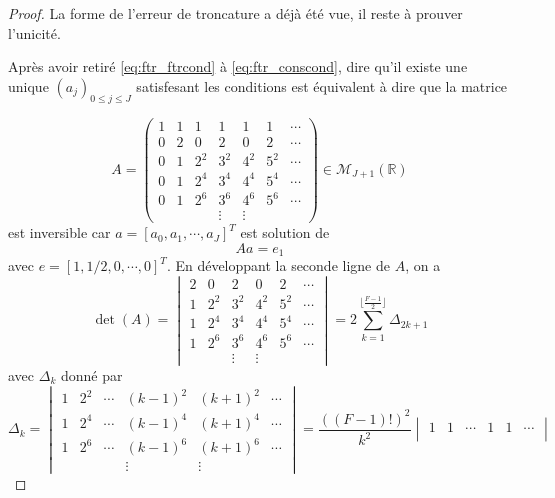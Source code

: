 \begin{proof}
La forme de l'erreur de troncature a déjà été vue, il reste à prouver l'unicité.

Après avoir retiré \eqref{eq:ftr_ftrcond} à \eqref{eq:ftr_conscond}, dire qu'il existe une unique $(a_j)_{0 \leq j \leq J}$ satisfesant les conditions est équivalent à dire que la matrice

\begin{equation}
A=\begin{pmatrix}
1 &  1  &  1  &  1  &  1  &  1  & \cdots\\  
0 &  2  &  0  &  2  &  0  & 2  & \cdots\\
0 &  1  & 2^2 & 3^2 & 4^2 & 5^2 & \cdots\\
0 &  1  & 2^4 & 3^4 & 4^4 & 5^4 & \cdots\\
0 &  1  & 2^6 & 3^6 & 4^6 & 5^6 & \cdots\\
&&& \vdots &  \vdots &
\end{pmatrix} \in \mathcal{M}_{J+1} \left( \mathbb{R} \right)
\end{equation}
est inversible car $a = [a_0, a_1, \cdots, a_J]^T$ est solution de 
\begin{equation}
A a = e_1
\end{equation}
avec $e = [1,1/2, 0,\cdots,0]^T$. En développant la seconde ligne de $A$, on a
\begin{equation}
\det ( A ) = \begin{vmatrix} 
2  &  0  &  2  &  0  & 2  & \cdots\\
1  & 2^2 & 3^2 & 4^2 & 5^2 & \cdots\\
1  & 2^4 & 3^4 & 4^4 & 5^4 & \cdots\\
1  & 2^6 & 3^6 & 4^6 & 5^6 & \cdots\\
& & \vdots &  \vdots &
\end{vmatrix} = 2 \sum_{k=1}^{\lfloor\frac{F-1}{2}\rfloor} \Delta_{2k+1}
\end{equation}
avec $\Delta_k$ donné par
\begin{equation}
\Delta_k = \begin{vmatrix} 
1 & 2^2 & \cdots & (k-1)^2 & (k+1)^2 & \cdots\\
1 & 2^4 & \cdots & (k-1)^4 & (k+1)^4 & \cdots\\
1 & 2^6 & \cdots & (k-1)^6 & (k+1)^6 & \cdots\\
&&& \vdots &  \vdots &
\end{vmatrix} = \dfrac{((F-1)!)^2}{k^2} \begin{vmatrix} 
1 & 1 & \cdots & 1 & 1 & \cdots\\

\end{vmatrix}
\end{equation}
\end{proof}
